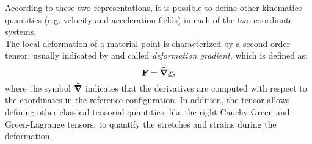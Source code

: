 According to these two representations, it is possible
to define other kinematics quantities (e.g. velocity and acceleration
fields) in each of the two coordinate systems.\\ The local deformation
of a material point is characterized by a second order tensor, usually
indicated by \F and called \textit{deformation gradient}, which is
defined as:
\begin{equation}
  \textbf{F} = \widehat{\boldsymbol{\nabla}}\underline{x},
  \label{eq:tensorF}
\end{equation}
where the symbol $\widehat{\boldsymbol{\nabla}}$ indicates that the
derivatives are computed with respect to the coordinates in the
reference configuration. In addition, the tensor \F{} allows defining
other classical tensorial quantities, like the right Cauchy-Green and
Green-Lagrange tensors, to quantify the stretches and strains during
the deformation.\\


